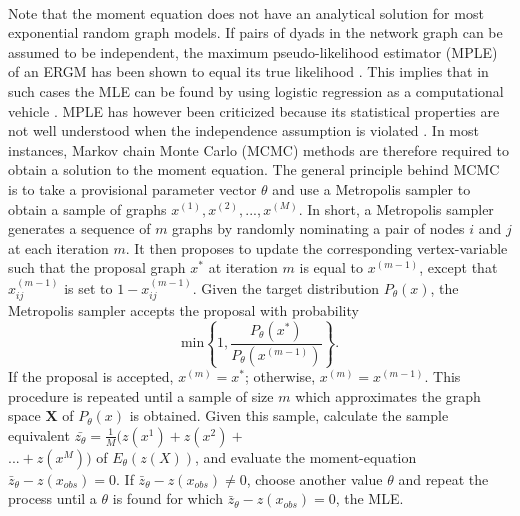 \documentclass[a4paper, man]{apa6}
\begin{document}
\\
Note that the moment equation does not have an analytical solution for most exponential random graph models. If pairs of dyads in the network graph can be assumed to be independent, the maximum pseudo-likelihood estimator (MPLE) of an ERGM has been shown to equal its true likelihood \cite{hunter2008ergm}. This implies that in such cases the MLE can be found by using logistic regression as a computational vehicle \cite{hunter2008ergm}. MPLE has however been criticized because its statistical properties are not well understood when the independence assumption is violated \cite{van2009framework}. In most instances, Markov chain Monte Carlo (MCMC) methods are therefore required to obtain a solution to the moment equation. The general principle behind MCMC is to take a provisional parameter vector $\theta$ and use a Metropolis sampler to obtain a sample of graphs $x^{(1)}, x^{(2)}, ..., x^{(M)}$. In short, a Metropolis sampler generates a sequence of $m$ graphs by randomly nominating a pair of nodes $i$ and $j$ at each iteration $m$. It then proposes to update the corresponding vertex-variable such that the proposal graph $x^{*}$ at iteration $m$ is equal to $x^{(m−1)}$, except that $x_{ij}^{(m-1)}$ is set to $1 − x_{ij}^{(m−1)}$. Given the target distribution $P_{\theta}(x)$, the Metropolis sampler accepts the proposal with probability \begin{equation} \label{eqn:eqn5} \text{min} \left\{1, \frac{P_{\theta}(x^{*})}{P_{\theta}(x^{(m-1)})} \right\}. \end{equation} If the proposal is accepted, $x^{(m)} = x^{*}$; otherwise, $x^{(m)} = x^{(m−1)}$. This procedure is repeated until a sample of size $m$ which approximates the graph space $\textbf{X}$ of $P_{\theta}(x)$ is obtained. Given this sample, calculate the sample equivalent $\bar{z_{\theta}} = \frac{1}{M}(z(x^{1}) + z(x^{2}) + $ \\ \noindent $... + z(x^{M}))$ of $E_{\theta}(z(X))$, and evaluate the moment-equation $\bar{z}_{\theta} − z(x_{obs}) = 0$. If $\bar{z}_{\theta} − z(x_{obs}) \neq 0$, choose another value $\theta$ and repeat the process until a $\theta$ is found for which $\bar{z}_{\theta} − z(x_{obs}) = 0$, the MLE. 
\\
\end{document}
